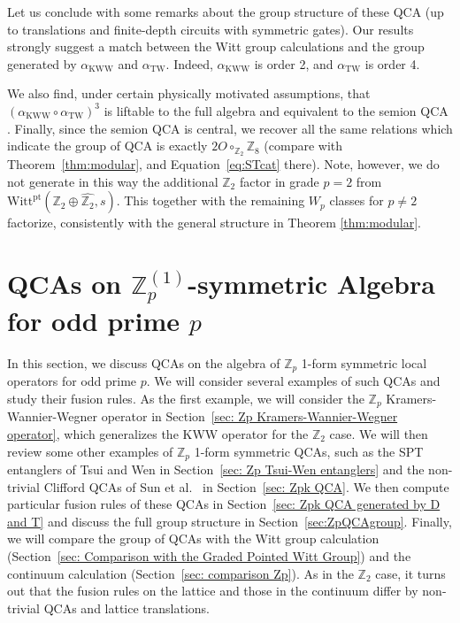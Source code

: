 \documentclass[aps,twocolumn,prx,floatfix,preprintnumbers, nofootinbib,10pt]{revtex4-2}
\numberwithin{equation}{section}
\theoremstyle{definition}
\theoremstyle{remark}
\theoremstyle{claim}
\newcommand{\aKWW}{\alpha_\text{KWW}}
\newcommand{\aTW}{\alpha_\text{TW}}
\newcommand{\Z}{{\mathbb Z}}
\newcommand{\Witt}{\text{Witt}}
\newcommand{\pt}{\text{pt}}
\begin{document}
{Let us conclude with some remarks about the group structure of these QCA (up to translations and finite-depth circuits with symmetric gates). Our results strongly suggest a match between the Witt group calculations and the group generated by $\aKWW$ and $\aTW$. Indeed, $\aKWW$ is order 2, and $\aTW$ is order 4.}

{We also find, under certain physically motivated assumptions, that $(\aKWW \circ \aTW)^3$ is liftable to the full algebra and equivalent to the semion QCA \cite{Shirley_2022}. Finally, since the semion QCA is central, we recover all the same relations which indicate the group of QCA is exactly $2O \circ_{\Z_2} \Z_8$ (compare with Theorem~\ref{thm:modular}, and Equation~\eqref{eq:STcat} there). Note, however, we do not generate in this way the additional $\Z_2$ factor in grade $p=2$ from $\Witt^\pt(\Z_2 \oplus \widehat{\Z_2}, s)$. This together with the remaining $W_p$ classes for $p\not=2$ factorize,  consistently with the general structure in Theorem \ref{thm:modular}. }






\section{QCAs on $\mathbb{Z}_p^{(1)}$-symmetric Algebra for odd prime $p$}
\label{sec: QCAs on Zp 1-form symmetric algebra}

In this section, we discuss QCAs on the algebra of $\mathbb{Z}_p$ 1-form symmetric local operators for odd prime $p$.
We will consider several examples of such QCAs and study their fusion rules.
As the first example, we will consider the $\mathbb{Z}_p$ Kramers-Wannier-Wegner operator in Section~\ref{sec: Zp Kramers-Wannier-Wegner operator}, which generalizes the KWW operator for the $\mathbb{Z}_2$ case.
We will then review some other examples of $\mathbb{Z}_p$ 1-form symmetric QCAs, such as the SPT entanglers of Tsui and Wen \cite{Tsui:2019ykk} in Section~\ref{sec: Zp Tsui-Wen entanglers} and the non-trivial Clifford QCAs of Sun et al.~\cite{MengSun2026} in Section~\ref{sec: Zpk QCA}.
We then compute particular fusion rules of these QCAs in Section~\ref{sec: Zpk QCA generated by D and T} and discuss the full group structure in Section~\ref{sec:ZpQCAgroup}.
Finally, we will compare the group of QCAs with the Witt group calculation (Section~\ref{sec: Comparison with the Graded Pointed Witt Group}) and the continuum calculation (Section~\ref{sec: comparison Zp}).
As in the $\mathbb{Z}_2$ case, it turns out that the fusion rules on the lattice and those in the continuum differ by non-trivial QCAs and lattice translations.
\end{document}
